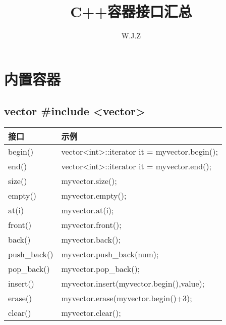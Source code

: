 \documentclass{article}
\title{C++容器接口汇总}
\author{W.J.Z}
\date{}
\begin{document}
	\section{内置容器}
	\subsection{vector \#include <vector>}
	\begin{table}[h]
		\centering
		\begin{tabular}{|p{3cm}|p{10cm}|}
			\hline
			接口 & 示例 \\
			\hline
			begin() & vector<int>::iterator it = myvector.begin(); \\
			\hline
			end() &  vector<int>::iterator it = myvector.end(); \\
			\hline
			size() & myvector.size();  \\
			\hline
			empty() & myvector.empty(); \\
			\hline
			at(i) & myvector.at(i); \\
			\hline
			front() & myvector.front(); \\
			\hline
			back() & myvector.back(); \\
			\hline
			push\_back() & myvector.push\_back(num); \\
			\hline
			pop\_back() & myvector.pop\_back();\\
			\hline
			insert() & myvector.insert(myvector.begin(),value);\\
			\hline 
			erase() & myvector.erase(myvector.begin()+3);\\
			\hline
			clear() & myvector.clear();\\
			\hline
		\end{tabular}
	\end{table}
\end{document}

